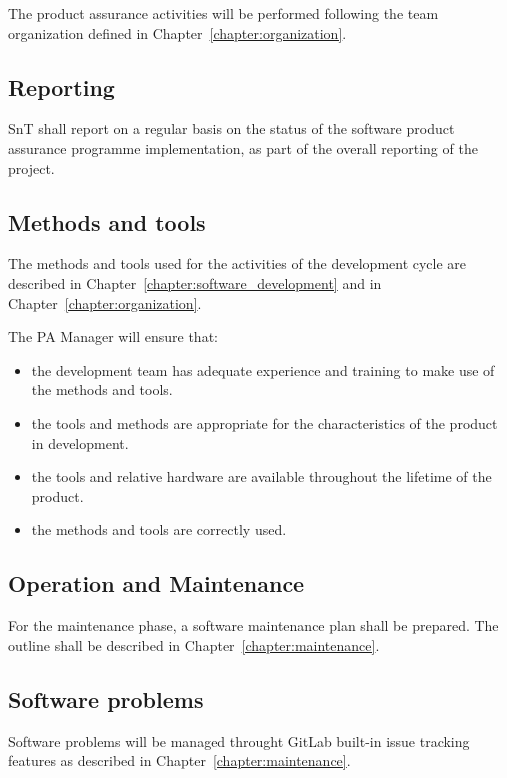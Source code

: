 The product assurance activities will be performed following the team organization defined in Chapter~\ref{chapter:organization}.

\subsection{Reporting}
SnT shall report on a regular basis on the status of the software product assurance programme implementation, as part of the overall reporting of the project.


\subsection{Methods and tools}

The methods and tools used for the activities of the development cycle are described in Chapter~\ref{chapter:software_development} and in Chapter~\ref{chapter:organization}.

The PA Manager will ensure that:
\begin{itemize}
  \item the development team has adequate experience and training to make use of  the methods and tools.
  \item the tools and methods are appropriate for the characteristics of the product in development.
  \item the tools and relative hardware are available throughout the lifetime of the product.
  \item the methods and tools are correctly used.
\end{itemize}


\subsection{Operation and Maintenance}
For the maintenance phase, a software maintenance plan shall be prepared.
The outline shall be described in Chapter~\ref{chapter:maintenance}.

\subsection{Software problems}

Software problems will be managed throught GitLab built-in issue tracking features as described in Chapter~\ref{chapter:maintenance}.
